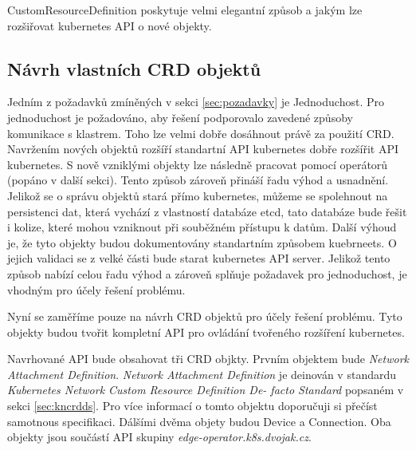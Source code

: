 CustomResourceDefinition poskytuje velmi elegantní způsob a jakým lze rozšiřovat kubernetes API o nové objekty.  
\subsection{Návrh vlastních CRD objektů}
Jedním z požadavků zmíněných v sekci \ref{sec:pozadavky} je Jednoduchost. Pro jednoduchost je požadováno, aby řešení podporovalo zavedené způsoby komunikace s klastrem. Toho lze velmi dobře dosáhnout právě za použití CRD. Navržením nových objektů rozšíří standartní API kubernetes dobře rozšířit API kubernetes. S nově vzniklými objekty lze následně pracovat pomocí operátorů (popáno v další sekci). Tento způsob zároveň přináší řadu výhod a usnadnění. Jelikož se o správu objektů stará přímo kubernetes, můžeme se spolehnout na persistenci dat, která vychází z vlastností databáze etcd, tato databáze bude řešit i kolize, které mohou vzniknout při souběžném přístupu k datům. Další výhoud je, že tyto objekty budou dokumentovány standartním způsobem kuebrneets. O jejich validaci se z velké části bude starat kubernetes API server. Jelikož tento způsob nabízí celou řadu výhod a zároveň splňuje požadavek pro jednoduchost, je vhodným pro účely řešení problému.

Nyní se zaměříme pouze na návrh CRD objektů pro účely řešení problému. Tyto objekty budou tvořit kompletní API pro ovládání tvořeného rozšíření kubernetes.

Navrhované API bude obsahovat tři CRD objkty. Prvním objektem bude \textit{Network Attachment Definition}. \textit{Network Attachment Definition} je deinován v standardu \textit{Kubernetes Network Custom Resource Definition De-
facto Standard} popsaném v sekci \ref{sec:kncrdds}. Pro více informací o tomto objektu doporučuji si přečíst samotnous specifikaci. Dálšími dvěma objety budou Device a Connection. Oba objekty jsou součástí API skupiny \textit{edge-operator.k8s.dvojak.cz}.  
